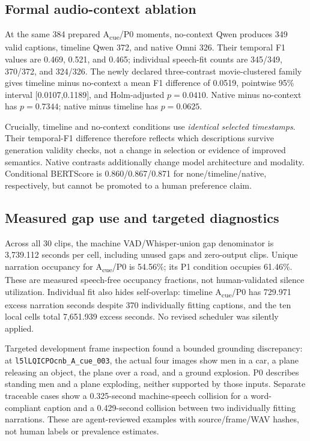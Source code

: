 \documentclass[10pt,twocolumn]{article}
\newcommand{\Acue}{A\textsubscript{cue}}
\begin{document}
\subsection{Formal audio-context ablation}
At the same 384 prepared \Acue{}/P0 moments, no-context Qwen produces 349 valid captions, timeline Qwen 372, and native Omni 326. Their temporal F1 values are 0.469, 0.521, and 0.465; individual speech-fit counts are 345/349, 370/372, and 324/326. The newly declared three-contrast movie-clustered family gives timeline minus no-context a mean F1 difference of 0.0519, pointwise 95\% interval [0.0107,0.1189], and Holm-adjusted $p=0.0410$. Native minus no-context has $p=0.7344$; native minus timeline has $p=0.0625$.

Crucially, timeline and no-context conditions use \emph{identical selected timestamps}. Their temporal-F1 difference therefore reflects which descriptions survive generation validity checks, not a change in selection or evidence of improved semantics. Native contrasts additionally change model architecture and modality. Conditional BERTScore is 0.860/0.867/0.871 for none/timeline/native, respectively, but cannot be promoted to a human preference claim.

\subsection{Measured gap use and targeted diagnostics}
Across all 30 clips, the machine VAD/Whisper-union gap denominator is 3,739.112 seconds per cell, including unused gaps and zero-output clips. Unique narration occupancy for \Acue{}/P0 is 54.56\%; its P1 condition occupies 61.46\%. These are measured speech-free occupancy fractions, not human-validated silence utilization. Individual fit also hides self-overlap: timeline \Acue{}/P0 has 729.971 excess narration seconds despite 370 individually fitting captions, and the ten local cells total 7,651.939 excess seconds. No revised scheduler was silently applied.

Targeted development frame inspection found a bounded grounding discrepancy: at \texttt{l5lLQICPOcnb\_A\_cue\_003}, the actual four images show men in a car, a plane releasing an object, the plane over a road, and a ground explosion. P0 describes standing men and a plane exploding, neither supported by those inputs. Separate traceable cases show a 0.325-second machine-speech collision for a word-compliant caption and a 0.429-second collision between two individually fitting narrations. These are agent-reviewed examples with source/frame/WAV hashes, not human labels or prevalence estimates.
\end{document}
